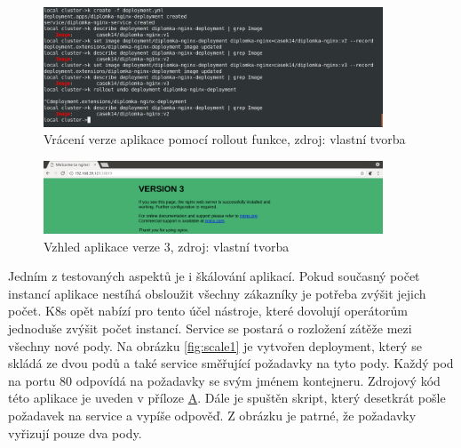 \begin{figure}[H]
  \begin{centering}
    
	  \includegraphics[width=0.9\textwidth]{images/rollout.png}
    \par
	  \caption{Vrácení verze aplikace pomocí rollout funkce\label{fig:deployment-rollout}, zdroj: vlastní tvorba}
    \end{centering}
\end{figure}

\begin{figure}[H]
  \begin{centering}
    
	  \includegraphics[width=0.9\textwidth]{images/v3.png}
    \par
	  \caption{Vzhled aplikace verze 3\label{fig:v3}, zdroj: vlastní tvorba}
    \end{centering}
\end{figure}

Jedním z testovaných aspektů je i škálování aplikací. Pokud současný počet instancí aplikace nestíhá obsloužit všechny zákazníky je potřeba zvýšit jejich počet. K8s opět nabízí pro tento účel nástroje, které dovolují operátorům jednoduše zvýšit počet instancí. Service se postará o rozložení zátěže mezi všechny nové pody. Na obrázku \ref{fig:scale1} je vytvořen deployment, který se skládá ze dvou podů a také service směřující požadavky na tyto pody. Každý pod na portu 80 odpovídá na požadavky se svým jménem kontejneru. Zdrojový kód této aplikace je uveden v příloze \hyperref[app:hostname]{A}. Dále je spuštěn skript, který desetkrát pošle požadavek na service a vypíše odpověď. Z obrázku je patrné, že požadavky vyřizují pouze dva pody.

